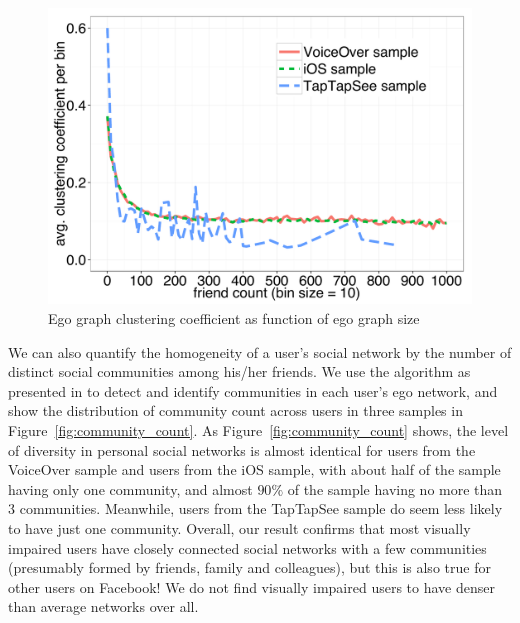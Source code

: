 \documentclass{sigchi}
\begin{document}



\begin{figure}[htb]
\centering
\includegraphics[width=0.9\columnwidth]{friendcount_clustering_coefficient.pdf}
\caption{Ego graph clustering coefficient as function of ego graph size}
\label{fig:friendcount_density}
\end{figure}


We can also quantify the homogeneity of a user's social network by the number of distinct social communities among his/her friends. We use the algorithm as presented in \cite{ugander2011} to detect and identify communities in each user's ego network, and show the distribution of community count across users in three samples in Figure~\ref{fig:community_count}. As Figure~\ref{fig:community_count} shows, the level of diversity in personal social networks is almost identical for users from the VoiceOver sample and users from the iOS sample, with about half of the sample having only one community, and almost $90\%$ of the sample having no more than 3 communities. Meanwhile, users from the TapTapSee sample do seem less likely to have just one community. Overall, our result confirms that most visually impaired users have closely connected social networks with a few communities (presumably formed by friends, family and colleagues), but this is also true for other users on Facebook! We do not find visually impaired users to have denser than average networks over all.
\end{document}
